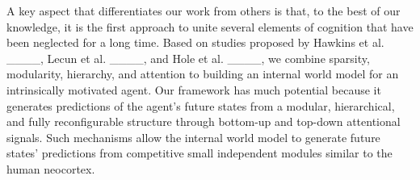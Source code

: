 A key aspect that differentiates our work from others is that, to the best of our knowledge, it is the first approach to unite several elements of cognition that have been neglected for a long time. Based on studies proposed by Hawkins et al. ____, Lecun et al. ____, and Hole et al. ____, we combine sparsity, modularity, hierarchy, and attention to building an internal world model for an intrinsically motivated agent. Our framework has much potential because it generates predictions of the agent's future states from a modular, hierarchical, and fully reconfigurable structure through bottom-up and top-down attentional signals. Such mechanisms allow the internal world model to generate future states' predictions from competitive small independent modules similar to the human neocortex.









